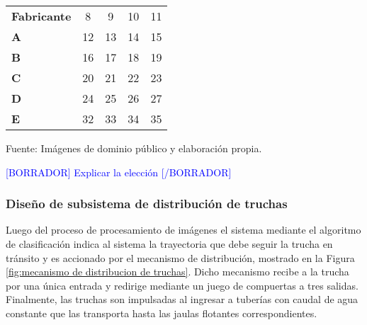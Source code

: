 \begin{mytable}[H]
\begin{tabular}{l|c|c|c|c|}
\begin{minipage}{\mythirdmaxsizeofcontenttable}
		\end{minipage} 
		\\ \hline
		\multicolumn{1}{|l|}{\textbf{Fabricante}} & 8                                                                     & 9          & 10         & 11         \\ \hline
		\multicolumn{1}{|l|}{\textbf{A}}          & 12                                                                    & 13         & 14         & 15         \\ \hline
		\multicolumn{1}{|l|}{\textbf{B}}          & 16                                                                    & 17         & 18         & 19         \\ \hline
		\multicolumn{1}{|l|}{\textbf{C}}          & 20                                                                    & 21         & 22         & 23         \\ \hline
		\multicolumn{1}{|l|}{\textbf{D}}          & 24                                                                    & 25         & 26         & 27         \\ \hline
		\multicolumn{1}{|l|}{\textbf{E}}          & 32                                                                    & 33         & 34         & 35         \\ \hline
	\end{tabular}
	\begin{flushleft}	
		Fuente: Imágenes de dominio público y elaboración propia.
	\end{flushleft}
\end{mytable}

\textcolor{blue}{[BORRADOR] Explicar la elección [/BORRADOR]}


\subsubsection{Diseño de subsistema de distribución de truchas}

Luego del proceso de procesamiento de imágenes el sistema mediante el algoritmo de clasificación indica al sistema la trayectoria que debe seguir la trucha en tránsito y es accionado por el mecanismo de distribución, mostrado en la Figura \ref{fig:mecanismo de distribucion de truchas}. Dicho mecanismo recibe a la trucha por una única entrada y redirige mediante un juego de compuertas a tres salidas. Finalmente, las truchas son impulsadas al ingresar a tuberías con caudal de agua constante que las transporta hasta las jaulas flotantes correspondientes.

